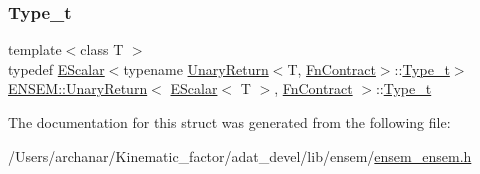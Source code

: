 \subsubsection{\texorpdfstring{Type\_t}{Type\_t}\hspace{0.1cm}{\footnotesize\ttfamily [2/2]}}
{\footnotesize\ttfamily template$<$class T $>$ \\
typedef \mbox{\hyperlink{classENSEM_1_1EScalar}{E\+Scalar}}$<$typename \mbox{\hyperlink{structENSEM_1_1UnaryReturn}{Unary\+Return}}$<$T, \mbox{\hyperlink{structENSEM_1_1FnContract}{Fn\+Contract}}$>$\+::\mbox{\hyperlink{structENSEM_1_1UnaryReturn_3_01EScalar_3_01T_01_4_00_01FnContract_01_4_a0838f4fd4b6341784128502cc2256180}{Type\+\_\+t}}$>$ \mbox{\hyperlink{structENSEM_1_1UnaryReturn}{E\+N\+S\+E\+M\+::\+Unary\+Return}}$<$ \mbox{\hyperlink{classENSEM_1_1EScalar}{E\+Scalar}}$<$ T $>$, \mbox{\hyperlink{structENSEM_1_1FnContract}{Fn\+Contract}} $>$\+::\mbox{\hyperlink{structENSEM_1_1UnaryReturn_3_01EScalar_3_01T_01_4_00_01FnContract_01_4_a0838f4fd4b6341784128502cc2256180}{Type\+\_\+t}}}



The documentation for this struct was generated from the following file\+:\begin{DoxyCompactItemize}
\item 
/\+Users/archanar/\+Kinematic\+\_\+factor/adat\+\_\+devel/lib/ensem/\mbox{\hyperlink{lib_2ensem_2ensem__ensem_8h}{ensem\+\_\+ensem.\+h}}\end{DoxyCompactItemize}
